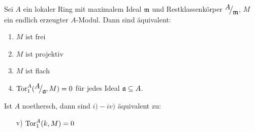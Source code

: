 \begin{sa}\label{14.7}
	Sei $A$ ein lokaler Ring mit maximalem Ideal $\mathfrak{m}$ und Restklassenkörper $\QR{A}{\m}$, $M$ ein endlich erzeugter $A$-Modul. Dann sind äquivalent:
	\begin{enumerate}[label= \roman*)]
		\item $M$ ist frei
		\item $M$ ist projektiv
		\item $M$ ist flach
		\item $\Tor_1^A(\QR{A}{\a}, M) =0$ für jedes Ideal $\mathfrak{a}\subseteq A$.
	\end{enumerate}
Ist $A$ noethersch, dann sind $i) -iv)$ äquivalent zu:
\begin{enumerate}
	\item[v)] $\text{Tor}_1^A(k,M) = 0$ 
\end{enumerate}
\end{sa}
